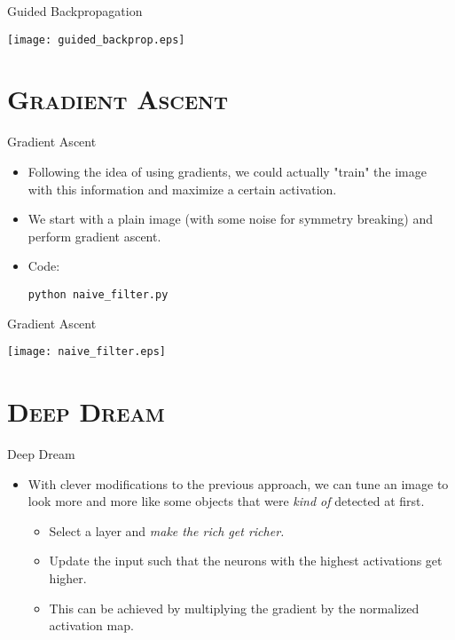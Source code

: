 \begin{frame}{Guided Backpropagation}
	\begin{center}
		\texttt{[image: guided\_backprop.eps]}
	\end{center}
\end{frame}

\section{\scshape Gradient Ascent}
\begin{frame}{Gradient Ascent}
	\begin{itemize}
		\item Following the idea of using gradients, we could actually "train" the image with this information and maximize a certain activation.
		\item We start with a plain image (with some noise for symmetry breaking) and perform gradient ascent.
		\item<2-> Code:
		\begin{center}
			{\smaller \texttt{python naive\_filter.py}}
		\end{center}
	\end{itemize}
\end{frame}

\begin{frame}{Gradient Ascent}
	\begin{center}
		\texttt{[image: naive\_filter.eps]}
	\end{center}
\end{frame}

\section{\scshape Deep Dream}
\begin{frame}{Deep Dream}
	\begin{itemize}
		\item With clever modifications to the previous approach, we can tune an image to
		look more and more like some objects that were \textit{kind of} detected at first.
		\begin{itemize}
			\item Select a layer and \textit{make the rich get richer.}
			\item Update the input such that the neurons with the highest activations get higher.
			\item This can be achieved by multiplying the gradient by the normalized activation map.
		\end{itemize}
	\end{itemize}
\end{frame}

